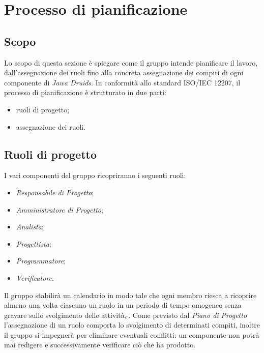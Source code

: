 \section{Processo di pianificazione}\label{ProcessiOrganizzativiProcessoDiPianificazione}

\subsection{Scopo}\label{ProcessiOrganizzativiProcessoDiPianificazioneScopo}

Lo scopo di questa sezione è spiegare come il gruppo intende pianificare il lavoro, dall'assegnazione dei ruoli fino alla concreta assegnazione dei compiti di ogni componente di \textit{Jawa Druids}. In conformità allo standard ISO/IEC 12207, il processo di pianificazione è strutturato in due parti:
\begin{itemize}
	\item ruoli di progetto;
	\item assegnazione dei ruoli.
\end{itemize}

\subsection{Ruoli di progetto}\label{ProcessiOrganizzativiProcessoDiPianificazioneRuoliDiProgetto}

I vari componenti del gruppo ricopriranno i seguenti ruoli:
\begin{itemize}
	\item \textit{Responsabile di Progetto};
	\item \textit{Amministratore di Progetto};
	\item \textit{Analista};
	\item \textit{Progettista};
	\item \textit{Programmatore};
	\item \textit{Verificatore}.
\end{itemize}

Il gruppo stabilirà un calendario in modo tale che ogni membro riesca a ricoprire almeno una volta ciascuno un ruolo in un periodo di tempo omogeneo senza gravare sullo svolgimento delle attività$_{\scaleto{G}{3pt}}$. Come previsto dal \textit{Piano di Progetto} l'assegnazione di un ruolo comporta lo svolgimento di determinati compiti, inoltre il gruppo si impegnerà per eliminare eventuali conflitti: un componente non potrà mai redigere e successivamente verificare ciò che ha prodotto.

